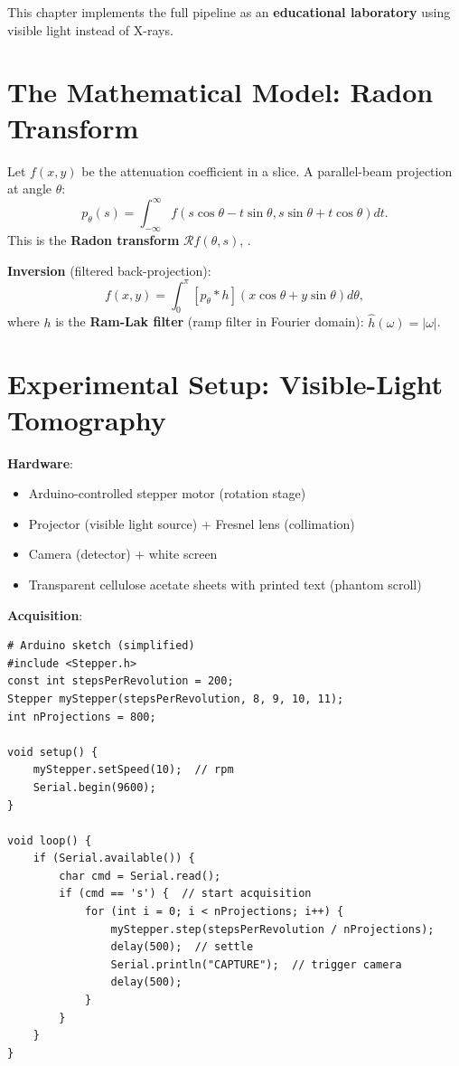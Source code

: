 This chapter implements the full pipeline as an \textbf{educational laboratory} using visible light instead of X-rays.

\section{The Mathematical Model: Radon Transform} \cite{foschiatti2025tomography}
\label{sec:tom:radon}

Let $f(x,y)$ be the attenuation coefficient in a slice. A parallel-beam projection at angle $\theta$:
\[
p_\theta(s) = \int_{-\infty}^{\infty} f(s\cos\theta - t\sin\theta, s\sin\theta + t\cos\theta) dt.
\]
This is the \textbf{Radon transform} $\mathcal{R}f(\theta, s)$, \cite{foschiatti2025tomography}.

\textbf{Inversion} (filtered back-projection):
\[
f(x,y) = \int_0^\pi \left[ p_\theta * h \right](x\cos\theta + y\sin\theta) d\theta,
\]
where $h$ is the \textbf{Ram-Lak filter} (ramp filter in Fourier domain): $\hat{h}(\omega) = |\omega|$.

\section{Experimental Setup: Visible-Light Tomography}
\label{sec:tom:setup}

\textbf{Hardware}:
\begin{itemize}
    \item Arduino-controlled stepper motor (rotation stage)
    \item Projector (visible light source) + Fresnel lens (collimation)
    \item Camera (detector) + white screen
    \item Transparent cellulose acetate sheets with printed text (phantom scroll)
\end{itemize}

\textbf{Acquisition}:
\begin{lstlisting}[style=python,caption=Arduino stepper control + camera sync]
# Arduino sketch (simplified)
#include <Stepper.h>
const int stepsPerRevolution = 200;
Stepper myStepper(stepsPerRevolution, 8, 9, 10, 11);
int nProjections = 800;

void setup() {
    myStepper.setSpeed(10);  // rpm
    Serial.begin(9600);
}

void loop() {
    if (Serial.available()) {
        char cmd = Serial.read();
        if (cmd == 's') {  // start acquisition
            for (int i = 0; i < nProjections; i++) {
                myStepper.step(stepsPerRevolution / nProjections);
                delay(500);  // settle
                Serial.println("CAPTURE");  // trigger camera
                delay(500);
            }
        }
    }
}
\end{lstlisting}

